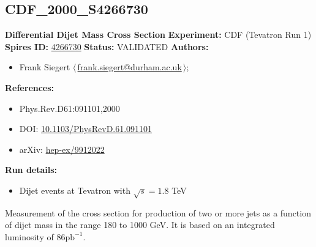 \clearpage


\clearpage

\subsection[CDF\_2000\_S4266730]{CDF\_2000\_S4266730\,\cite{Affolder:1999ua}}
\textbf{Differential Dijet Mass Cross Section}\newline
\textbf{Experiment:} CDF (Tevatron Run 1) \newline
\textbf{Spires ID:} \href{http://www.slac.stanford.edu/spires/find/hep/www?rawcmd=key+4266730}{4266730}\newline
\textbf{Status:} VALIDATED\newline
\textbf{Authors:}
\begin{itemize}
  \item Frank Siegert $\langle\,$\href{mailto:frank.siegert@durham.ac.uk}{frank.siegert@durham.ac.uk}$\,\rangle$;
\end{itemize}
\textbf{References:}
\begin{itemize}
  \item Phys.Rev.D61:091101,2000
  \item DOI: \href{http://dx.doi.org/10.1103/PhysRevD.61.091101}{10.1103/PhysRevD.61.091101}
  \item arXiv: \href{http://arxiv.org/abs/hep-ex/9912022}{hep-ex/9912022}
\end{itemize}
\textbf{Run details:}
\begin{itemize}

  \item Dijet events at Tevatron with $\sqrt{s}=1.8$ TeV\end{itemize}

\noindent Measurement of the cross section for production of two or more jets as a function of dijet mass in the range 180 to 1000 GeV. It is based on an integrated luminosity of $86 \mathrm{pb}^{-1}$.

\clearpage


\clearpage

